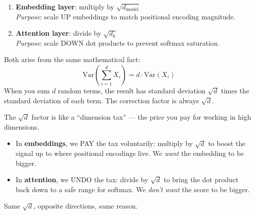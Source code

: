 \documentclass[11pt, a4paper]{article}
\begin{document}
\begin{formaldef}
\begin{enumerate}
\item \textbf{Embedding layer}: multiply by $\sqrt{d_\text{model}}$ \\
\emph{Purpose}: scale UP embeddings to match positional encoding magnitude.

\item \textbf{Attention layer}: divide by $\sqrt{d_k}$ \\
\emph{Purpose}: scale DOWN dot products to prevent softmax saturation.
\end{enumerate}

\noindent Both arise from the same mathematical fact:
\[
\boxed{\text{Var}\!\left(\sum_{i=1}^{d} X_i\right) = d \cdot \text{Var}(X_i)}
\]
When you sum $d$ random terms, the result has standard deviation $\sqrt{d}$ times
the standard deviation of each term. The correction factor is always $\sqrt{d}$.
\end{formaldef}

\begin{intuition}
The $\sqrt{d}$ factor is like a ``dimension tax'' --- the price you pay for working in high dimensions.

\begin{itemize}
\item In \textbf{embeddings}, we PAY the tax voluntarily: multiply by $\sqrt{d}$ to boost
the signal up to where positional encodings live. We \emph{want} the embedding to be bigger.

\item In \textbf{attention}, we UNDO the tax: divide by $\sqrt{d}$ to bring the dot product
back down to a safe range for softmax. We \emph{don't want} the score to be bigger.
\end{itemize}

\noindent Same $\sqrt{d}$, opposite directions, same reason.
\end{intuition}
\end{document}

